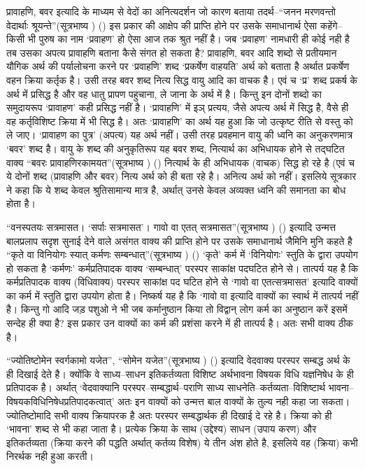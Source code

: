 प्रावाहणि, बवर इत्यादि के माध्यम से वेदों का अनित्यदर्शन जो कारण बताया तदर्थ–“जनन मरणवन्तो वेदार्थाः श्रूयन्ते”(सूत्रभाष्य ) () इस प्रकार की आक्षेप की प्राप्ति होने पर उसके समाधानार्थ ऐसा कहेंगे– किसी भी पुरुष का नाम ‘प्रवाहण' हो ऐसा आज तक श्रुत नहीं है। जब ‘प्रवाहण' नामधारी ही कोई नही है तब उसका अपत्य प्रावाहणि बताना कैसे संगत हो सकता है? प्रावाहणि, बवर आदि शब्दो से प्रतीयमान यौगिक अर्थ की पर्यालोचना करने पर ‘प्रवाहणि' शब्द ‘प्रकर्षेण वाहयति' अर्थ को बताता है अर्थात प्रकर्षेण वहन क्रिया कर्तृक है। उसी तरह बवर शब्द नित्य सिद्ध वायु आदि का वाचक है। एवं च ‘प्र' शब्द प्रकर्ष के अर्थ में प्रसिद्ध है और वह धातु प्रापण पहुचाना, ले जाना के अर्थ में है। किन्तु इन दोनों शब्दो का समुदायरूप ‘प्रावाहण' कही प्रसिद्ध नहीं है। ‘प्रावाहणि' में इञ् प्रत्यय, जैसे अपत्य अर्थ में सिद्ध है, वैसे ही वह कर्तृविशिष्ट क्रिया में भी सिद्ध है। अतः ‘प्रावाहणि' का अर्थ यह हुआ कि जो उत्कृष्ट रीति से वस्तु को ले जाए। ‘प्रावाहण का पुत्र' (अपत्य) यह अर्थ नहीं। उसी तरह प्रवहमान वायु की ध्वनि का अनुकरणमात्र ‘बवर' शब्द है। वायु के शब्द की अनुकृतिरूप यह बवर शब्द, नित्यार्थ का अभिधायक होने से तद्घटित वाक्य “बवरः प्रावाहणिरकामयत”(सूत्रभाष्य ) () नित्यार्थ के ही अभिधायक (वाचक) सिद्ध हो रहे है (एवं च ये दोनों शब्द (प्रावाहणि और बवर) नित्य अर्थ को ही बता रहे है। अनित्य अर्थ को नहीं। इसलिये सूत्रकार ने कहा कि ये शब्द केवल श्रुतिसामान्य मात्र है, अर्थात् उनसे केवल अव्यक्त ध्वनि की समानता का बोध होता है।

“वनस्पतयः सत्रमासत। ‘सर्पाः सत्रमासत'। गावो वा एतत् सत्रमासत”(सूत्रभाष्य ) () इत्यादि उन्मत्त बालप्रलाप सदृश सुनाई देने वाले असंगत वाक्य की प्राप्ति होने पर उसके समाधानार्थ जैमिनि मुनि कहते है “कृते वा विनियोगः स्यात् कर्मणः सम्बन्धात्”(सूत्रभाष्य ) () ‘कृते' कर्म में ‘विनियोगः' स्तुति के द्वारा उपयोग हो सकता है ‘कर्मणः' कर्मप्रतिपादक वाक्य ‘सम्बन्धात्' परस्पर साकांक्ष पदघटित होने से। तात्पर्य यह है कि कर्मप्रतिपादक वाक्य (विधिवाक्य) परस्पर साकांक्ष पद घटित होने से ‘गावो वा एतत्सत्रमासत' इत्यादि वाक्यों का कर्म में स्तुति द्वारा उपयोग होता है। निष्कर्ष यह है कि ‘गावो वा इत्यादि वाक्यों का स्वार्थ में तात्पर्य नहीं है। किन्तु गो आदि जड़ पशुओ ने भी जब कर्मानुष्ठान किया तो विद्वान् लोग कर्म का अनुष्ठान करें इसमें सन्देह ही क्या है? इस प्रकार उन वाक्यों का कर्म की प्रशंसा करने में ही तात्पर्य है। अतः सभी वाक्य ठीक है।

“ज्योतिष्टोमेन स्वर्गकामो यजेत”, “सोमेन यजेत”(सूत्रभाष्य ) () इत्यादि वेदवाक्य परस्पर सम्बद्ध अर्थ के ही दिखाई देते है। क्योंकि वे साध्य–साधन इतिकर्तव्यता विशिष्ट अर्थभावना विषयक विधि यज्ञनिषेध के ही प्रतिपादक है। अर्थात् ‘वेदवाक्यानि परस्पर–सम्बद्धार्थ–पराणि साध्य साधनेति–कर्तव्यता–विशिष्टार्थ भावना–विषयकविधिनिषेधप्रतिपादकत्वात्' अतः इन वाक्यों को उन्मत्त बाल वाक्यों के तुल्य नही कहा जा सकता। ज्योतिष्टोमादि सभी वाक्य क्रियापरक है अतः परस्पर सम्बद्धार्थक ही दिखाई दे रहे है। क्रिया को ही ‘भावना' शब्द से भी कहा जाता है। प्रत्येक क्रिया के साथ (उद्देश्य) साधन (उपाय करण) और इतिकर्तव्यता (क्रिया करने की पद्धति अर्थात् कर्तव्य विशेष) ये तीन अंश होते है, इसलिये वह (क्रिया) कभी निरर्थक नही हुआ करती।


